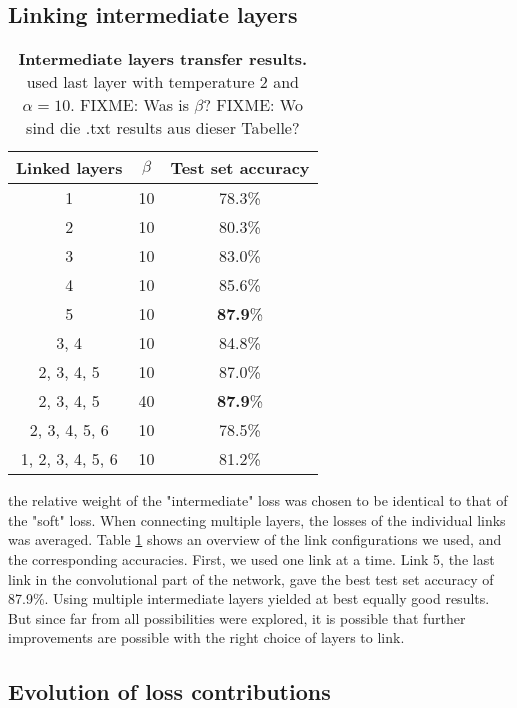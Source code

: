 \documentclass[10pt,twocolumn,letterpaper]{article}
\begin{document}
\subsection{Linking intermediate layers}
\begin{table}[]
	\begin{center}
	\begin{tabular}{|c|c|c|}
		\hline
		Linked layers		&	$\beta$	&	Test set accuracy	\\ \hline
		1					&	10		&	78.3\%				\\ \hline
		2					&	10		&	80.3\%				\\ \hline
		3					&	10		&	83.0\%				\\ \hline
		4					&	10		&	85.6\%				\\ \hline
		5					&	10		&	\textbf{87.9}\%		\\ \hline
		3, 4				&	10		&	84.8\%				\\ \hline
		2, 3, 4, 5			&	10		&	87.0\%				\\ \hline
		2, 3, 4, 5			&	40		&	\textbf{87.9}\%		\\ \hline
		2, 3, 4, 5, 6		&	10		&	78.5\%				\\ \hline
		1, 2, 3, 4, 5, 6	&	10		&	81.2\%				\\ \hline
	\end{tabular}
	\end{center}
	\caption{\textbf{Intermediate layers transfer results.} used last layer with temperature 2 and $ \alpha = 10 $.  FIXME: Was is $\beta$? FIXME: Wo sind die .txt results aus dieser Tabelle?}
	\label{tab:interemediate_results}
\end{table}
the relative weight of the "intermediate" loss was chosen to be identical to that of the "soft" loss. When connecting multiple layers, the losses of the individual links was averaged. Table \ref{tab:interemediate_results} shows an overview of the link configurations we used, and the corresponding accuracies. First, we used one link at a time. Link 5, the last link in the convolutional part of the network, gave the best test set accuracy of 87.9\%. Using multiple intermediate layers yielded at best equally good results. But since far from all possibilities were explored, it is possible that further improvements are possible with the right choice of layers to link.

\subsection{Evolution of loss contributions}
\end{document}
